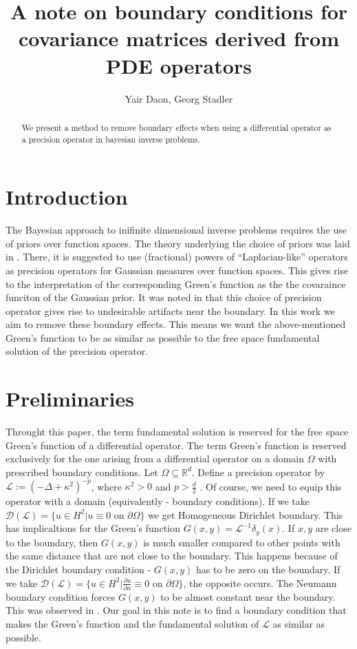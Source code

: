 \documentclass[paper=a4, fontsize=11pt]{scrartcl} %
\title{A note on boundary conditions for covariance matrices derived from PDE operators}
\author{Yair Daon, Georg Stadler}
\date{}
\numberwithin{equation}{section} %
\numberwithin{figure}{section} %
\numberwithin{table}{section} %
\newcommand{\Op}{\mathcal{L}}
\newcommand{\Dom}{\mathcal{D}}
\begin{document}
\maketitle
\begin{abstract}
We present a method to remove boundary effects when using a differential operator as a precision
operator in bayesian inverse problems.
\end{abstract}

\section{Introduction}
The Bayesian approach to inifinite dimensional inverse problems 
requires the use of priors over function spaces. 
The theory underlying the choice of priors was laid in \cite{stuart2010inverse}. There,
it is suggested to use (fractional) powers of ``Laplacian-like'' operators as 
precision operators for Gaussian measures over function spaces. 
This gives rise to the interpretation of
the corresponding Green's function as the the covaraince funciton of the Gaussian prior.
It was noted in \cite{bui2013computational} that this choice of precision operator
gives rise to undesirable artifacts near the boundary. In this work we aim to 
remove these boundary effects. This means we want the above-mentioned Green's function
to be as similar as possible to the free space fundamental solution of the 
precision operator.

\section{Preliminaries}

Throught this paper, the term fundamental solution is reserved for the free space Green's 
function of a differential operator. The term Green's function 
is reserved exclusively for the one arising from a differential
operator on a domain $\Omega$ with prescribed boundary conditions.
Let $\Omega \subseteq \mathbb{R}^d$. Define a precision operator
by $\Op := (-\Delta + \kappa^2 )^{-p}$, where $\kappa^2 > 0$
and $p > \frac{d}{2}$ \cite{stuart2010inverse}. Of course, we
need to equip this operator with a domain (equivalently - boundary conditions). If we
take $\Dom(\Op) = \{ u \in H^2 | u \equiv 0 \text{ on } \partial \Omega \}$ we
get Homogeneous Dirichlet boundary. This has implicaltions for the Green's function
$G(x,y) = \Op^{-1}\delta_{y}(x)$. If $x,y$ are close to the boundary, then $G(x,y)$
is much smaller compared to other points with the same distance that are not close 
to the boundary. This happens because of the Dirichlet boundary condition - $G(x,y)$ has
to be zero on the boundary. If we take
 $\Dom(\Op) = \{ u \in H^2 | \frac{\partial u}{\partial n} \equiv 0 \text{ on } \partial \Omega \}$,
the opposite occurs. The Neumann boundary condition forces $G(x,y)$ to be almost
constant near the boundary. This was observed in \cite{bui2013computational}. Our goal
in this note is to find a boundary condition that makes the Green's function and the
fundamental solution of $\Op$ as similar as possible.
\end{document}
